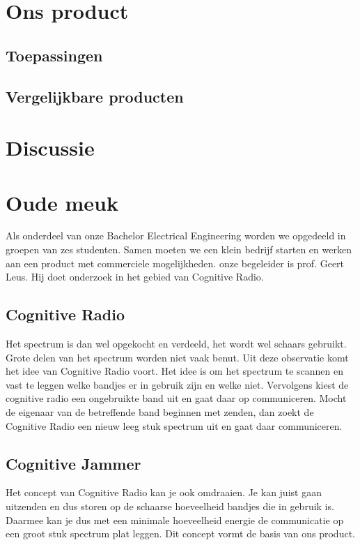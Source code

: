 \documentclass[oneside, a4paper, openany]{memoir}
\begin{document}
\chapter{Ons product}
\section{Toepassingen}
\section{Vergelijkbare producten}

\chapter{Discussie}


\clearpage
\chapter{Oude meuk}
Als onderdeel van onze Bachelor Electrical Engineering worden we opgedeeld in groepen van zes studenten. Samen moeten we een klein bedrijf starten en werken aan een product met commerciele mogelijkheden. onze begeleider is prof. Geert Leus. Hij doet onderzoek in het gebied van Cognitive Radio.

\section{Cognitive Radio}
Het spectrum is dan wel opgekocht en verdeeld, het wordt wel schaars gebruikt. Grote delen van het spectrum worden niet vaak benut. Uit deze observatie komt het idee van Cognitive Radio voort. Het idee is om het spectrum te scannen en vast te leggen welke bandjes er in gebruik zijn en welke niet. Vervolgens kiest de cognitive radio een ongebruikte band uit en gaat daar op communiceren. Mocht de eigenaar van de betreffende band beginnen met zenden, dan zoekt de Cognitive Radio een nieuw leeg stuk spectrum uit en gaat daar communiceren.

\section{Cognitive Jammer}
Het concept van Cognitive Radio kan je ook omdraaien. Je kan juist gaan uitzenden en dus storen op de schaarse hoeveelheid bandjes die in gebruik is. Daarmee kan je dus met een minimale hoeveelheid energie de communicatie op een groot stuk spectrum plat leggen. Dit concept vormt de basis van ons product.
\end{document}
